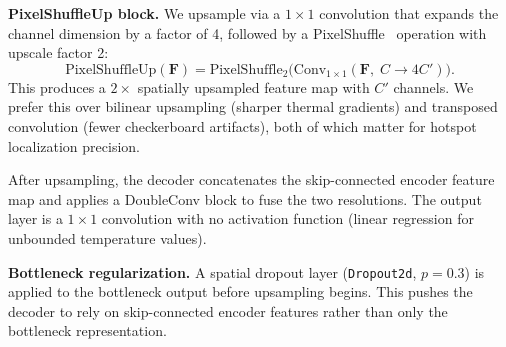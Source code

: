 \documentclass[10pt,twocolumn,letterpaper]{article}
\begin{document}
\textbf{PixelShuffleUp block.} We upsample via a $1\times1$
convolution that expands the channel dimension by a factor of 4,
followed by a PixelShuffle~\cite{PixelShuffle} operation with
upscale factor 2:
\begin{equation}
  \text{PixelShuffleUp}(\mathbf{F}) =
  \text{PixelShuffle}_2\bigl(\text{Conv}_{1\times1}(\mathbf{F},\;
  C \to 4C')\bigr).
\end{equation}
This produces a $2\times$ spatially upsampled feature map with $C'$
channels. We prefer this over bilinear upsampling (sharper thermal
gradients) and transposed convolution (fewer checkerboard artifacts),
both of which matter for hotspot localization precision.

After upsampling, the decoder concatenates the skip-connected encoder
feature map and applies a DoubleConv block to fuse the two
resolutions. The output layer is a $1\times1$ convolution with no
activation function (linear regression for unbounded temperature values).

\textbf{Bottleneck regularization.} A spatial dropout layer
(\texttt{Dropout2d}, $p {=} 0.3$) is applied to the bottleneck output before
upsampling begins. This pushes the decoder to rely on skip-connected
encoder features rather than only the bottleneck representation.
\end{document}
